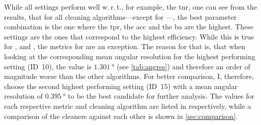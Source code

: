 While all settings perform well w.\,r.\,t., for example, the \gls{tnr}, one can see from the results, that for all cleaning
algorithms---except for \mars{}---, the best parameter combination is the one where the \gls{tpr}, the \gls{acc} and the \gls{ba}
are the highest. These settings are the ones that correspond to the highest efficiency. While this is true
for \tailcuts{}, \fact{} and \tcc{}, the metrics for \mars{} are an exception. The reason for that is, that when
looking at the corresponding mean angular resolution for the highest performing setting (ID~10), the value is
\(\SI{1.301}{\degree}\) (see \autoref{tab:angres}) and therefore an order of magnitude worse than the other algorithms. For better
comparison, I, therefore, choose the second highest performing setting (ID~15) with a mean angular
resolution of \(\SI{0.395}{\degree}\) to be the best candidate for further analysis.
The values for each respective metric and cleaning algorithm are listed in
 respectively, while
a comparison of the cleaners against each other is shown in \autoref{sec:comparison}.
\begin{table}
    \centering
    \caption{Results for the metrics of \tailcuts{}. One can see, that the best results are obtained
    for the settings with ID~47.}
    \label{tab:metrics_tail}
\end{table}

